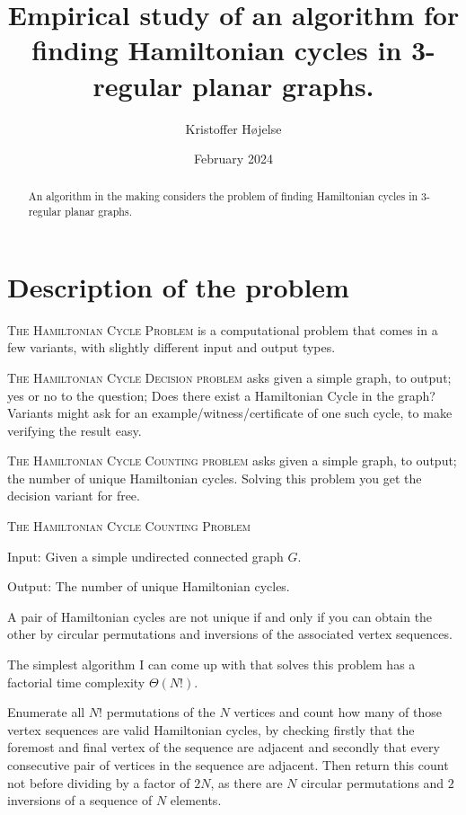 \documentclass{article}
\title{Empirical study of an algorithm for finding Hamiltonian cycles in 3-regular planar graphs.}
\author{Kristoffer Højelse}
\date{February 2024}
\begin{document}
\maketitle

\begin{abstract}
	An algorithm in the making considers the problem of finding Hamiltonian cycles in 3-regular planar graphs.
\end{abstract}

\section{Description of the problem}

	\textsc{The Hamiltonian Cycle Problem} is a computational problem that comes in a few variants, with slightly different input and output types.

	\textsc{The Hamiltonian Cycle Decision problem} asks given a simple graph, to output; yes or no to the question; Does there exist a Hamiltonian Cycle in the graph? Variants might ask for an example/witness/certificate of one such cycle, to make verifying the result easy.

	\textsc{The Hamiltonian Cycle Counting problem} asks given a simple graph, to output; the number of unique Hamiltonian cycles. Solving this problem you get the decision variant for free.

	\begin{definition}
		\textsc{The Hamiltonian Cycle Counting Problem}

		Input: Given a simple undirected connected graph $G$.

		Output: The number of unique Hamiltonian cycles.
		
		A pair of Hamiltonian cycles are not unique if and only if you can obtain the other by circular permutations and inversions of the associated vertex sequences.
	\end{definition}

	The simplest algorithm I can come up with that solves this problem has a factorial time complexity $\Theta(N!)$.

	Enumerate all $N!$ permutations of the $N$ vertices and count how many of those vertex sequences are valid Hamiltonian cycles, by checking firstly that the foremost and final vertex of the sequence are adjacent and secondly that every consecutive pair of vertices in the sequence are adjacent. Then return this count not before dividing by a factor of $2N$, as there are $N$ circular permutations and $2$ inversions of a sequence of $N$ elements.
\end{document}
